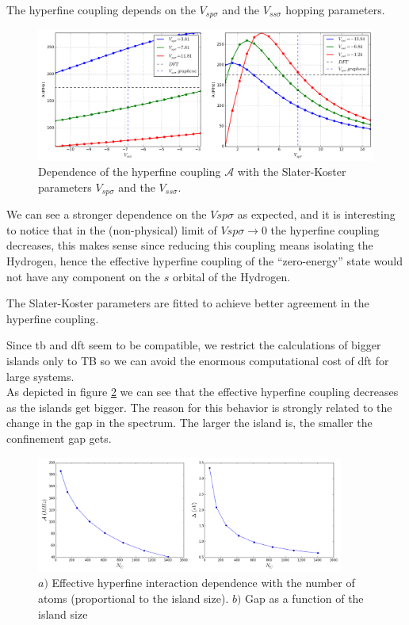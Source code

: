 The hyperfine coupling depends on the $V_{sp\sigma}$ and the $V_{ss\sigma}$ hopping parameters.
\begin{figure}[h!]
\centering
\includegraphics{chapter05/figures/hf_SK.png}
\vspace{-5pt}
\caption{Dependence of the hyperfine coupling $\mathcal{A}$ with the Slater-Koster parameters $V_{sp\sigma}$ and the $V_{ss\sigma}$.}
\label{hf_SK}
\end{figure}
\FloatBarrier
We can see a stronger dependence on the $Vsp\sigma$ as expected, and it is interesting to notice that in the (non-physical) limit of $Vsp\sigma\rightarrow0$ the hyperfine coupling decreases, this makes sense since reducing this coupling means isolating the Hydrogen, hence the effective hyperfine coupling of the ``zero-energy'' state would not have any component on the $s$ orbital of the Hydrogen.

The Slater-Koster parameters are fitted to achieve better agreement in the hyperfine coupling.

Since \ac{tb} and \ac{dft} seem to be compatible, we restrict the calculations of bigger islands only to TB so we can avoid the enormous computational cost of \ac{dft} for large systems.\\

As depicted in figure \ref{hyper} we can see that the effective hyperfine coupling decreases as the islands get bigger. The reason for this behavior is strongly related to the change in the gap in the spectrum. The larger the island is, the smaller the confinement gap gets.
\begin{figure}
\centering
\includegraphics[width=0.9\textwidth]{chapter05/figures/hypergap.png}
\caption{$a)$ Effective hyperfine interaction dependence with the number of atoms (proportional to the island size). $b)$ Gap as a function of the island size}
\label{hyper}
\end{figure}
\FloatBarrier




